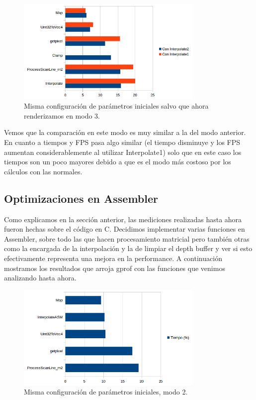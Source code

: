 \documentclass[a4paper]{article}
\begin{document}
\begin{figure}[H]
    \centering
    \includegraphics[width=0.8\textwidth]{Imagenes/gprof3.png}
    \caption{Misma configuración de parámetros iniciales salvo que ahora renderizamos en modo 3.}
    \label{fig:mesh1}
\end{figure}

Vemos que la comparación en este modo es muy similar a la del modo anterior. En cuanto a tiempos y FPS pasa algo similar (el tiempo disminuye y los FPS aumentan considerablemente al utilizar Interpolate1) solo que en este caso los tiempos son un poco mayores debido a que es el modo más costoso por los cálculos con las normales.

\subsection{Optimizaciones en Assembler}
Como explicamos en la sección anterior, las mediciones realizadas hasta ahora fueron hechas sobre el código en C. Decidimos implementar varias funciones en Assembler, sobre todo las que hacen procesamiento matricial pero también otras como la encargada de la interpolación y la de limpiar el depth buffer y ver si esto efectivamente representa una mejora en la performance. A continuación mostramos los resultados que arroja gprof con las funciones que venimos analizando hasta ahora.

\begin{figure}[H]
    \centering
    \includegraphics[width=0.8\textwidth]{Imagenes/gprof4.png}
    \caption{Misma configuración de parámetros iniciales, modo 2.}
    \label{fig:mesh1}
\end{figure}
\end{document}
